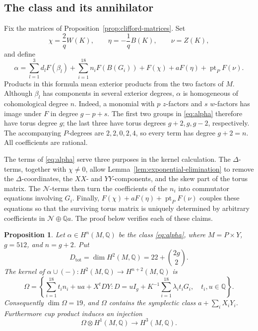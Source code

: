 \documentclass[11pt]{article}
\numberwithin{equation}{section}
\newtheorem{proposition}[theorem]{Proposition}
\theoremstyle{definition}
\theoremstyle{remark}
\begin{document}
\subsection{The class and its annihilator}

Fix the matrices of Proposition~\ref{prop:clifford-matrices}.  Set
\begin{equation}\label{eq:auxiliary-exterior-forms}
 \chi=\frac2q W(K),\qquad
 \eta=-\frac1q B(K),\qquad
 \nu=Z(K),
\end{equation}
and define
\begin{equation}\label{eq:alpha}
 \alpha=\sum_{l=1}^3 d_lF(\beta_l)
       +\sum_{i=1}^{18}n_iF(B(G_i))
       +F(\chi)+aF(\eta)+\operatorname{pt}_PF(\nu).
\end{equation}
Products in this formula mean exterior products from the two factors
of $M$.  Although $\beta_l$ has components in several exterior
degrees, $\alpha$ is homogeneous of cohomological degree $n$.
Indeed, a monomial with $p$ $z$-factors and $s$ $w$-factors has image
under $F$ in degree $g-p+s$.  The first two groups in
\eqref{eq:alpha} therefore have torus degree $g$; the last three
have torus degrees $g+2,g,g-2$, respectively.  The accompanying
$P$-degrees are $2,2,0,2,4$, so every term has degree $g+2=n$.
All coefficients are rational.

The terms of \eqref{eq:alpha} serve three purposes in the kernel
calculation.  The $\Delta$-terms, together with $\chi\ne0$, allow
Lemma~\ref{lem:exponential-elimination} to remove the $\Delta$-coordinates,
the $XX$- and $YY$-components, and the skew part of the torus matrix.
The $\mathcal N$-terms then turn the coefficients of the $n_i$ into
commutator equations involving $G_i$.  Finally,
$F(\chi)+aF(\eta)+\operatorname{pt}_PF(\nu)$ couples these equations so that the
surviving torus matrix is uniquely determined by arbitrary coefficients
in $\mathcal N\oplus\mathbb Q a$.  The proof below verifies each of these claims.

\begin{proposition}\label{prop:cup-kernel}
Let $\alpha\in H^n(M,\mathbb Q)$ be the class \eqref{eq:alpha}, where
$M=P\times Y$, $g=512$, and $n=g+2$.  Put
\[
 D_{\mathrm{tot}}=\dim H^2(M,\mathbb Q)=22+\binom{2g}{2}.
\]
The kernel of
$\alpha\cup(-):H^2(M,\mathbb Q)\longrightarrow H^{n+2}(M,\mathbb Q)$ is
\begin{equation}\label{eq:omega}
 \Omega=\left\{
   \sum_{i=1}^{18}t_i n_i+ua+X^tDY:
   D=uI_g+K^{-1}\sum_{i=1}^{18}\lambda_i t_iG_i,
   \quad t_i,u\in\mathbb Q\right\}.
\end{equation}
Consequently $\dim\Omega=19$, and $\Omega$ contains the symplectic
class $a+\sum_iX_iY_i$.  Furthermore cup product induces an injection
\begin{equation}\label{eq:omega-h1-injective}
 \Omega\otimes H^1(M,\mathbb Q)\longrightarrow H^3(M,\mathbb Q).
\end{equation}
\end{proposition}
\end{document}
